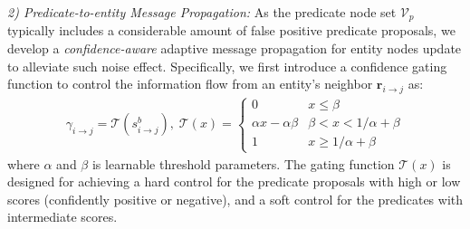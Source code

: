 \noindent \textit{2) Predicate-to-entity Message Propagation:}
As the predicate node set $\mathcal{V}_{p}$ typically includes a considerable amount of false positive predicate proposals, 
we develop a \textit{confidence-aware} adaptive message propagation for entity nodes update to alleviate such noise effect.
Specifically, we first introduce a confidence gating function to control the information flow from an entity's neighbor $\mathbf{r}_{i\rightarrow j}$ as:
\begin{align}
       \gamma_{i\to j} = \mathcal{T}(s^b_{i\to j}), \; \mathcal{T}(x) 
        =\left\{
        \begin{array}{cc}
        0       & x \leq \beta \\
        \alpha  x-\alpha  \beta & \beta<x<1 / \alpha +\beta \\
        1       & x \geq 1 / \alpha +\beta
        \end{array}
        \right. \label{2_stage_gating}
\end{align}
where $\alpha$ and $\beta$ is learnable threshold parameters. 
The gating function $\mathcal{T}(x)$ is designed for achieving a hard control for the predicate proposals with high or low scores (confidently positive or negative), and a soft control for the predicates with intermediate scores.


